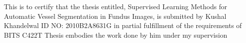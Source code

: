 
\begin{declaration}

This is to certify that the thesis entitled, Supervised Learning Methods for Automatic Vessel Segmentation in Fundus Images, is submitted by Kushal Khandelwal ID NO: 2010B2A8631G in partial fulfillment of the requirements of BITS C422T Thesis embodies the work done by him under my supervision


\end{declaration}

